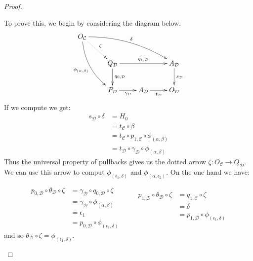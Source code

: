 \documentclass[a4paper,UKenglish,cleveref,pdftex,thm-restate,numberwithinsect]{lipics-v2021}
\begin{document}
\begin{proof}
\begin{enumerate}
\begin{itemize}
				
				To prove this, we begin by considering the diagram below.
							 \[\xymatrix{   O_{\mathcal{C}} \ar@/^.4cm/[drrr]^{\delta} \ar@{.>}[dr]^{\zeta}\ar@/_.4cm/[ddr]_{\phi_{(\alpha, \beta)}}\\ & Q_{\mathcal{D}} \ar[rr]^{q_{1, \mathcal{D}}}  \ar[d]^{q_{0, \mathcal{D}}} & & A_{\mathcal{D}} \ar[d]^{s_{\mathcal{D}}} \\ &   P_{\mathcal{D}} \ar[r]_{\gamma_{\mathcal{D}}}& A_{\mathcal{D}} \ar[r]_{t_{\mathcal{D}}} & O_{\mathcal{D}} }\]
				If we compute we get:
				\begin{align*}
					s_{\mathcal{D}}\circ \delta&=H_0
					\\&=t_{\mathcal{C}}\circ \beta
					\\&=t_{\mathcal{C}}\circ p_{1, \mathcal{C}}\circ \phi_{(\alpha, \beta)}
					\\&=t_{\mathcal{D}}\circ \gamma_{\mathcal{D}}\circ \phi_{(\alpha, \beta)}
				\end{align*}
				Thus the universal property of pullbacks gives us the dotted arrow $\zeta\colon O_{\mathcal{C}}\to Q_{\mathcal{D}}$. We can use this arrow to comput $\phi_{(\epsilon_1, \delta)}$ and $\phi_{(\alpha, \epsilon_2)}$. On the one hand we have:
				
				\[\begin{split}
					p_{0, \mathcal{D}}\circ \theta_{\mathcal{D}}\circ \zeta &= \gamma_{\mathcal{D}}\circ q_{0, \mathcal{D}}\circ \zeta\\&=\gamma_{\mathcal{D}}\circ \phi_{(\alpha, \beta)}\\&=\epsilon_1\\&=p_{0, \mathcal{D}}\circ \phi_{(\epsilon_1, \delta)}
				\end{split} \qquad  \begin{split}p_{1, \mathcal{D}}\circ \theta_{\mathcal{D}} \circ \zeta &= q_{1, \mathcal{C}}\circ \zeta \\&=\delta\\&= p_{1, \mathcal{D}}\circ \phi_{(\epsilon_1, \delta)}\\&
				\end{split}\]
				and so $\theta_{\mathcal{D}} \circ \zeta =\phi_{(\epsilon_1, \delta)}$. 
				

\end{itemize}
\end{enumerate}
\end{proof}
\end{document}
